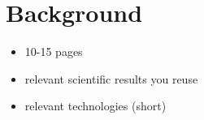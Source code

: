 \section{Background}
\label{sec:background}

\begin{itemize} 
    \item 10-15 pages
    \item relevant scientific results you reuse 
    \item relevant technologies (short)
\end{itemize}